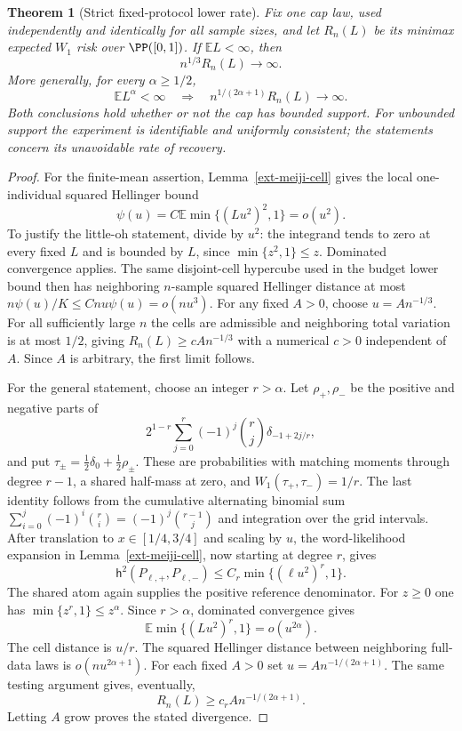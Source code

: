\documentclass[11pt,a4paper]{article}
\newtheorem{theorem}{Theorem}[section]
\theoremstyle{definition}\newtheorem{definition}[theorem]{Definition}
\theoremstyle{remark}\newtheorem{remark}[theorem]{Remark}
\newcommand{\E}{\mathbb E}\newcommand{\one}{\mathbf 1}\newcommand{\1}{\mathbf 1}
\numberwithin{equation}{section}
\begin{document}
\begin{theorem}[Strict fixed-protocol lower rate]
\label{ext-meiji-fixed}
Fix one cap law, used independently and identically for all sample sizes,
and let $R_n(L)$ be its minimax expected $W_1$ risk over $\PP([0,1])$.
If $\E L<\infty$, then
\[
                  n^{1/3}R_n(L)\longrightarrow\infty.
\]
More generally, for every $\alpha\ge1/2$,
\[
 \E L^\alpha<\infty
 \quad\Longrightarrow\quad
 n^{1/(2\alpha+1)}R_n(L)\longrightarrow\infty.
\]
Both conclusions hold whether or not the cap has bounded support. For
unbounded support the experiment is identifiable and uniformly consistent;
the statements concern its unavoidable rate of recovery.
\end{theorem}
\begin{proof}
For the finite-mean assertion, Lemma~\ref{ext-meiji-cell} gives the local
one-individual squared Hellinger bound
\[
 \psi(u)=C\E\min\{(Lu^2)^2,1\}=o(u^2).
\]
To justify the little-oh statement, divide by $u^2$: the integrand tends
to zero at every fixed $L$ and is bounded by $L$, since
$\min\{z^2,1\}\le z$. Dominated convergence applies.
The same disjoint-cell hypercube used in the budget lower bound then has
neighboring $n$-sample squared Hellinger distance at most
$n\psi(u)/K\le Cn u\psi(u)=o(nu^3)$.
For any fixed $A>0$, choose $u=A n^{-1/3}$. For all sufficiently large
$n$ the cells are admissible and neighboring total variation is at most
$1/2$, giving $R_n(L)\ge c A n^{-1/3}$ with a numerical $c>0$ independent
of $A$. Since $A$ is arbitrary, the first limit follows.

For the general statement, choose an integer $r>\alpha$. Let
$\rho_+,\rho_-$ be the positive and negative parts of
\[
 2^{1-r}\sum_{j=0}^r(-1)^j\binom{r}{j}\delta_{-1+2j/r},
\]
and put $\tau_\pm=\tfrac12\delta_0+\tfrac12\rho_\pm$. These are
probabilities with matching moments through degree $r-1$, a shared
half-mass at zero, and $W_1(\tau_+,\tau_-)=1/r$. The last identity follows
from the cumulative alternating binomial sum
$\sum_{i=0}^j(-1)^i\binom ri=(-1)^j\binom{r-1}j$ and integration over the
grid intervals. After translation to $x\in[1/4,3/4]$ and scaling by $u$,
the word-likelihood expansion in Lemma~\ref{ext-meiji-cell}, now starting
at degree $r$, gives
\[
 \mathsf h^2(P_{\ell,+},P_{\ell,-})
       \le C_r\min\{(\ell u^2)^r,1\}.
\]
The shared atom again supplies the positive reference denominator.
For $z\ge0$ one has $\min\{z^r,1\}\le z^\alpha$.
Since $r>\alpha$, dominated convergence gives
\[
 \E\min\{(Lu^2)^r,1\}=o(u^{2\alpha}).
\]
The cell distance is $u/r$. The squared Hellinger distance between
neighboring full-data laws is $o(nu^{2\alpha+1})$.
For each fixed $A>0$ set $u=A n^{-1/(2\alpha+1)}$.
The same testing argument gives, eventually,
\[
 R_n(L)\ge c_r A n^{-1/(2\alpha+1)}.
\]
Letting $A$ grow proves the stated divergence.
\end{proof}
\end{document}
